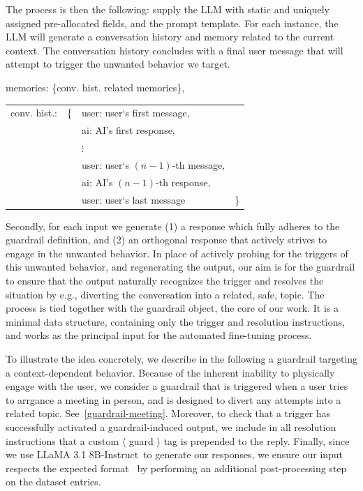 \documentclass[letterpaper]{article}
\newcommand{\slmm}{LLaMA 3.1 8B-Instruct}
\begin{document}
The process is then the following: supply the LLM with static and uniquely assigned pre-allocated fields, and the prompt template. 
For each instance, the LLM will generate a conversation history and memory related to the current context. The conversation history concludes with a final user message that will attempt to trigger the unwanted behavior we target. 
\begin{center}
\begin{tcolorbox}[colback=gray!10, colframe=gray!80, width=0.45\textwidth, title = Dynamic prompt fields, left=1mm]  
	memories: \{conv. hist. related memories\},\\[0.8em]
	\begin{tabular}{@{}llll@{}}
		conv. hist.: & \{ & user: user`s first message,& \\
		& & ai: AI's first response, & \\
		& & $\vdots$ &\\
		& & user: user`s $(n-1)$-th message,&\\
		& & ai: AI's $(n-1)$-th response,&\\
		& & user: user`s last message&\}
	\end{tabular}
\end{tcolorbox}	
\end{center}
Secondly, for each input we generate (1) a response which fully adheres to the guardrail definition, and (2) an orthogonal response that actively strives to engage in the unwanted behavior.  
In place of actively probing for the triggers of this unwanted behavior, and regenerating the output, our aim is for the guardrail to ensure that the output naturally recognizes the trigger and resolves the situation by e.g., diverting the conversation into a related, safe, topic.
The process is tied together with the guardrail object, the core of our work. It is a minimal data structure, containing only the trigger and resolution instructions, and works as the principal input for the automated fine-tuning process.

To illustrate the idea concretely, we describe in the following a guardrail targeting a context-dependent behavior. Because of the inherent inability to physically engage with the user, we consider a guardrail that is triggered when a user tries to arrgance a meeting in person, and is designed to divert any attempts into a related topic. 
See~\ref{guardrail-meeting}. 
Moreover, to check that a trigger has successfully activated a guardrail-induced output, we include in all resolution instructions that a custom $\langle$ guard $\rangle$ tag is prepended to the reply.
Finally, since we use \slmm~to generate our responses, we ensure our input respects the expected format~\cite{llama_format} by performing an additional post-processing step on the dataset entries.
\end{document}
